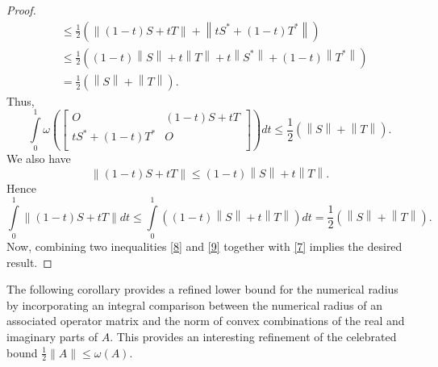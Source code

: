 \documentclass[12pt,twoside,reqno]{amsart}
\numberwithin{equation}{section}
\begin{document}
\begin{proof}
\[\begin{aligned}
 & \le \frac{1}{2}\left( \left\| \left( 1-t \right)S+tT \right\|+\left\| t{{S}^{*}}+\left( 1-t \right){{T}^{*}} \right\| \right) \\ 
 & \le \frac{1}{2}\left( \left( 1-t \right)\left\| S \right\|+t\left\| T \right\|+t\left\| {{S}^{*}} \right\|+\left( 1-t \right)\left\| {{T}^{*}} \right\| \right) \\ 
 & =\frac{1}{2}\left( \left\| S \right\|+\left\| T \right\| \right).  
\end{aligned}\]
Thus,
\begin{equation}\label{8}
\int\limits_{0}^{1}{\omega \left( \left[ \begin{matrix}
   O & \left( 1-t \right)S+tT  \\
   t{{S}^{*}}+\left( 1-t \right){{T}^{*}} & O  \\
\end{matrix} \right] \right)dt}\le \frac{1}{2}\left( \left\| S \right\|+\left\| T \right\| \right).
\end{equation}
We also have
\[\left\| \left( 1-t \right)S+tT \right\|\le \left( 1-t \right)\left\| S \right\|+t\left\| T \right\|.\]
Hence
\begin{equation}\label{9}
\int\limits_{0}^{1}{\left\| \left( 1-t \right)S+tT \right\|dt}\le \int\limits_{0}^{1}{\left( \left( 1-t \right)\left\| S \right\|+t\left\| T \right\| \right)dt}=\frac{1}{2}\left( \left\| S \right\|+\left\| T \right\| \right).
\end{equation}
Now, combining two inequalities \eqref{8} and \eqref{9} together with \eqref{7} implies the desired result.
\end{proof}

The following corollary provides a refined lower bound for the numerical radius by incorporating an integral comparison between the numerical radius of an associated operator matrix and the norm of convex combinations of the real and imaginary parts of $A$. This provides an interesting refinement of the celebrated bound $\frac{1}{2}\|A\|\leq \omega(A).$
\end{document}
